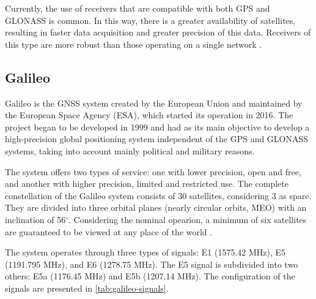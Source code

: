 Currently, the use of receivers that are compatible with both GPS and GLONASS is common. In this way, there is a greater availability of satellites, resulting in faster data acquisition and greater precision of this data. Receivers of this type are more robust than those operating on a single network \cite{angrisano2012}.

\subsection{Galileo}


Galileo is the GNSS system created by the European Union and maintained by the European Space Agency (ESA), which started its operation in 2016. The project began to be developed in 1999 and had as its main objective to develop a high-precision global positioning system independent of the GPS and GLONASS systems, taking into account mainly political and military reasons.


The system offers two types of service: one with lower precision, open and free, and another with higher precision, limited and restricted use. The complete constellation of the Galileo system consists of 30 satellites, considering 3 as spare. They are divided into three orbital planes (nearly circular orbits, MEO) with an inclination of 56$^{\circ}$. Considering the nominal opearion, a minimum of six satellites are guaranteed to be viewed at any place of the world \cite{hofmann-wellenhof2007}.


The system operates through three types of signals: E1 (1575.42 MHz), E5 (1191.795 MHz), and E6 (1278.75 MHz). The E5 signal is subdivided into two others: E5a (1176.45 MHz) and E5b (1207.14 MHz). The configuration of the signals are presented in \autoref{tab:galileo-signals}.

